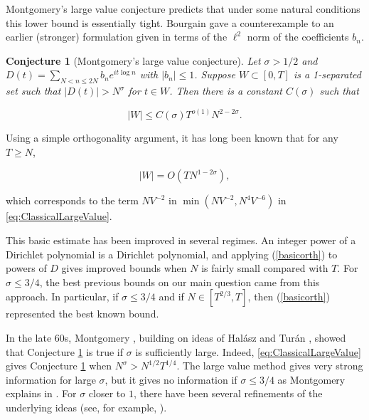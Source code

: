 \documentclass{amsart}
\theoremstyle{plain}
\newtheorem{cnjctr}[thrm]{Conjecture}
\numberwithin{equation}{section}
\begin{document}
 Montgomery's large value conjecture \cite[page 142, Conjecture 2]{M2} predicts that under some natural conditions this lower bound is essentially tight. Bourgain \cite{Bour} gave a counterexample to an earlier (stronger) formulation given in terms of the $\ell^2$ norm of the coefficients $b_n$.

%
%


\begin{cnjctr}[Montgomery's large value conjecture] \label{cnjctr:Montgomery} 
Let $\sigma > 1/2$ and $D(t) = \sum_{N<n\le 2N} b_n e^{i t \log n}$ with $|b_n| \le 1$.  Suppose $W \subset [0,T] $ is a 1-separated set such that $|D(t)| > N^\sigma$ for $t\in W$.   Then there is a constant $C(\sigma)$ such that

\[
|W| \le C(\sigma) T^{o(1)} N^{2 - 2 \sigma}.
\]

\end{cnjctr}

%
%


Using a simple orthogonality argument,  it has long been known that for any $T \ge N$, 

\begin{equation} \label{basicorth} |W| = O( T N^{1 - 2 \sigma}),
\end{equation} 

which corresponds to the term $NV^{-2}$ in $\min(NV^{-2},N^4V^{-6})$ in \eqref{eq:ClassicalLargeValue}.


This basic estimate has been improved in several regimes.    An integer power of a Dirichlet polynomial is a Dirichlet polynomial, and applying (\ref{basicorth}) to powers of $D$ gives improved bounds when $N$ is fairly small compared with $T$.  For $\sigma \le 3/4$,  the best previous bounds on our main question came from this approach.  In particular, if $\sigma \le 3/4$ and if $N\in[T^{2/3}, T]$,  then (\ref{basicorth}) represented the best known bound.  

In the late 60s,  Montgomery \cite{M}, building on ideas of Hal\'asz \cite{H} and Tur\'an \cite{HT},  showed that Conjecture \ref{cnjctr:Montgomery} is true if $\sigma$ is sufficiently large. Indeed, \eqref{eq:ClassicalLargeValue} gives Conjecture \ref{cnjctr:Montgomery} when $N^\sigma>N^{1/2}T^{1/4}$. The large value method gives very strong information for large $\sigma$,  but it gives no information if $\sigma \le 3/4$ as Montgomery explains in \cite[page 141]{M2}. For $\sigma$ closer to $1$, there have been several refinements of the underlying ideas (see, for example, \cite{B,HB3,J}).
\end{document}

